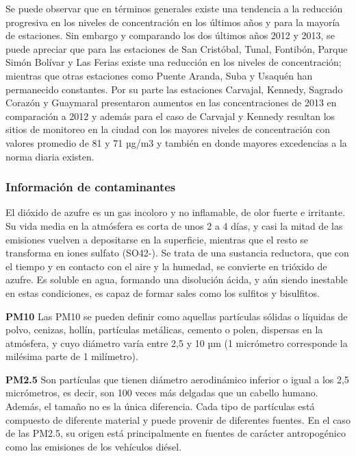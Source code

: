 Se puede observar que en términos generales existe una tendencia a la reducción progresiva en los niveles de concentración en los últimos años y para la mayoría de estaciones. Sin embargo y comparando los dos últimos años 2012 y 2013, se puede apreciar que  para las estaciones de San Cristóbal, Tunal, Fontibón, Parque Simón Bolívar y Las Ferias existe una reducción en los niveles de concentración; mientras que otras estaciones como Puente Aranda, Suba y Usaquén han permanecido constantes.
Por su parte las estaciones Carvajal, Kennedy, Sagrado Corazón y Guaymaral presentaron aumentos en las concentraciones de 2013 en comparación a 2012 y además para el caso de Carvajal y Kennedy resultan los sitios de monitoreo en la ciudad con los mayores niveles de concentración con valores promedio de 81 y 71 µg/m3 y también en donde mayores excedencias a la norma diaria existen.

\subsubsection{Información de contaminantes}

El dióxido de azufre es un gas incoloro y no inflamable, de olor fuerte e irritante. Su vida media en la atmósfera es corta de unos 2 a 4 días, y casi la mitad de las emisiones vuelven a depositarse en la superficie, mientras que el resto se transforma en iones sulfato (SO42-). Se trata de una sustancia reductora, que con el tiempo y en contacto con el aire y la humedad, se convierte en trióxido de azufre. Es soluble en agua, formando una disolución ácida, y aún siendo inestable en estas condiciones, es capaz de formar sales como los sulfitos y bisulfitos.

\textbf{PM10} 
Las PM10 se pueden definir como aquellas partículas sólidas o líquidas de polvo, cenizas, hollín, partículas metálicas, cemento o polen, dispersas en la atmósfera, y cuyo diámetro varía entre 2,5 y 10 µm (1 micrómetro corresponde la milésima parte de 1 milímetro).

\textbf{PM2.5} 
Son partículas que tienen diámetro aerodinámico inferior o igual a los 2,5 micrómetros, es decir, son 100 veces más delgadas que un cabello humano.
Además, el tamaño no es la única diferencia. Cada tipo de partículas está compuesto de diferente material y puede provenir de diferentes fuentes. En el caso de las PM2.5, su origen está principalmente en fuentes de carácter antropogénico como las emisiones de los vehículos diésel.


